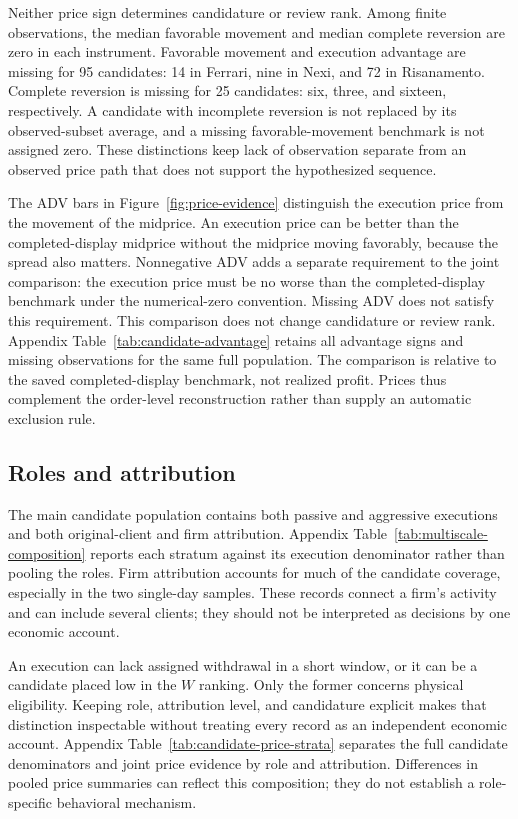 \documentclass[11pt]{article}
\begin{document}
Neither price sign determines candidature or review rank. Among finite observations, the median favorable movement and median complete reversion are zero in each instrument. Favorable movement and execution advantage are missing for 95 candidates: 14 in Ferrari, nine in Nexi, and 72 in Risanamento. Complete reversion is missing for 25 candidates: six, three, and sixteen, respectively. A candidate with incomplete reversion is not replaced by its observed-subset average, and a missing favorable-movement benchmark is not assigned zero. These distinctions keep lack of observation separate from an observed price path that does not support the hypothesized sequence.


The ADV bars in Figure~\ref{fig:price-evidence} distinguish the execution price from the movement of the midprice. An execution price can be better than the completed-display midprice without the midprice moving favorably, because the spread also matters. Nonnegative ADV adds a separate requirement to the joint comparison: the execution price must be no worse than the completed-display benchmark under the numerical-zero convention. Missing ADV does not satisfy this requirement. This comparison does not change candidature or review rank. Appendix Table~\ref{tab:candidate-advantage} retains all advantage signs and missing observations for the same full population. The comparison is relative to the saved completed-display benchmark, not realized profit. Prices thus complement the order-level reconstruction rather than supply an automatic exclusion rule.

\FloatBarrier
\subsection{Roles and attribution}
\label{subsec:timing_recurrence_results}

The main candidate population contains both passive and aggressive executions and both original-client and firm attribution. Appendix Table~\ref{tab:multiscale-composition} reports each stratum against its execution denominator rather than pooling the roles. Firm attribution accounts for much of the candidate coverage, especially in the two single-day samples. These records connect a firm's activity and can include several clients; they should not be interpreted as decisions by one economic account.



An execution can lack assigned withdrawal in a short window, or it can be a candidate placed low in the $W$ ranking. Only the former concerns physical eligibility. Keeping role, attribution level, and candidature explicit makes that distinction inspectable without treating every record as an independent economic account. Appendix Table~\ref{tab:candidate-price-strata} separates the full candidate denominators and joint price evidence by role and attribution. Differences in pooled price summaries can reflect this composition; they do not establish a role-specific behavioral mechanism.
\end{document}
